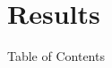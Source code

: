 \documentclass{beamer}
\begin{document}

\section{Results}
\begin{frame}{Table of Contents}
    \tableofcontents[currentsection]
\end{frame}
\end{document}
